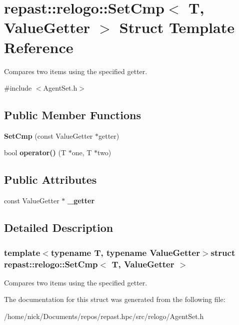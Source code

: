 \hypertarget{structrepast_1_1relogo_1_1_set_cmp}{\section{repast\-:\-:relogo\-:\-:Set\-Cmp$<$ T, Value\-Getter $>$ Struct Template Reference}
\label{structrepast_1_1relogo_1_1_set_cmp}
}


Compares two items using the specified getter.  




{\ttfamily \#include $<$Agent\-Set.\-h$>$}

\subsection*{Public Member Functions}
\begin{DoxyCompactItemize}
\item 
\hypertarget{structrepast_1_1relogo_1_1_set_cmp_a43b579d59a9292f40fd24672090fca75}{{\bfseries Set\-Cmp} (const Value\-Getter $\ast$getter)}\label{structrepast_1_1relogo_1_1_set_cmp_a43b579d59a9292f40fd24672090fca75}

\item 
\hypertarget{structrepast_1_1relogo_1_1_set_cmp_a460d264b98975b66038a7cc0eead34a9}{bool {\bfseries operator()} (T $\ast$one, T $\ast$two)}\label{structrepast_1_1relogo_1_1_set_cmp_a460d264b98975b66038a7cc0eead34a9}

\end{DoxyCompactItemize}
\subsection*{Public Attributes}
\begin{DoxyCompactItemize}
\item 
\hypertarget{structrepast_1_1relogo_1_1_set_cmp_a26d5897fee7b4dee6f8735649cb4be23}{const Value\-Getter $\ast$ {\bfseries \-\_\-getter}}\label{structrepast_1_1relogo_1_1_set_cmp_a26d5897fee7b4dee6f8735649cb4be23}

\end{DoxyCompactItemize}


\subsection{Detailed Description}
\subsubsection*{template$<$typename T, typename Value\-Getter$>$struct repast\-::relogo\-::\-Set\-Cmp$<$ T, Value\-Getter $>$}

Compares two items using the specified getter. 

The documentation for this struct was generated from the following file\-:\begin{DoxyCompactItemize}
\item 
/home/nick/\-Documents/repos/repast.\-hpc/src/relogo/Agent\-Set.\-h\end{DoxyCompactItemize}
